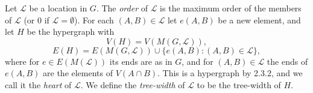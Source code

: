 Let $\mathscr{L}$ be a location in $G$. The \textit{order} of $\mathscr{L}$ is the maximum order of the members of $\mathscr{L}$ (or $0$ if $\mathscr{L} = \emptyset$). For each $(A, B) \in \mathscr{L}$ let $e(A, B)$ be a new element, and let $H$ be the hypergraph with
\begin{equation*}
V(H) = V(M(G, \mathscr{L})),
\end{equation*}
\begin{equation*}
E(H) = E(M(G, \mathscr{L})) \cup \{e(A, B) \colon (A, B) \in \mathscr{L}\},
\end{equation*}
where for $e \in E(M(\mathscr{L}))$ its ends are as in $G$, and for $(A, B) \in \mathscr{L}$ the ends of $e(A, B)$ are the elements of $V(A \cap B)$. This is a hypergraph by 2.3.2, and we call it the \textit{heart} of $\mathscr{L}$. We define the \textit{tree-width} of $\mathscr{L}$ to be the tree-width of $H$.
